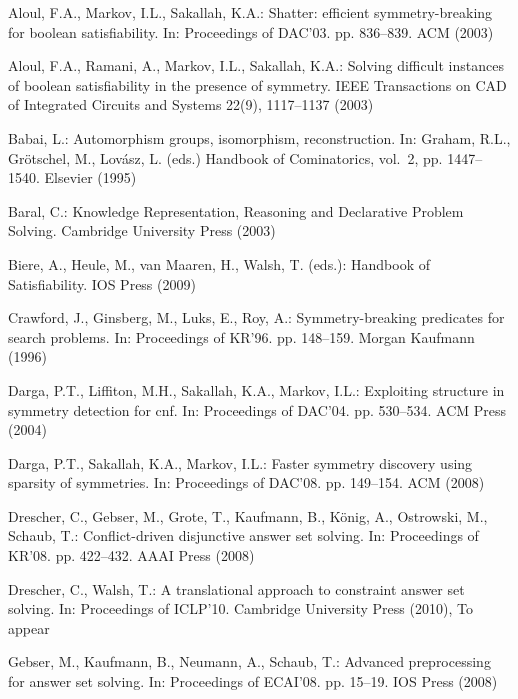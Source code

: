 \documentclass[envcountsame]{llncs}
\begin{document}
\begin{thebibliography}{10}
\providecommand{\url}[1]{\texttt{#1}}
\providecommand{\urlprefix}{URL }

Aloul, F.A., Markov, I.L., Sakallah, K.A.: Shatter: efficient symmetry-breaking
  for boolean satisfiability. In: Proceedings of DAC'03. pp. 836--839. ACM
  (2003)

Aloul, F.A., Ramani, A., Markov, I.L., Sakallah, K.A.: Solving difficult
  instances of boolean satisfiability in the presence of symmetry. IEEE
  Transactions on CAD of Integrated Circuits and Systems  22(9),  1117--1137
  (2003)

Babai, L.: Automorphism groups, isomorphism, reconstruction. In: Graham, R.L.,
  Gr{\"o}tschel, M., Lov{\'a}sz, L. (eds.) Handbook of Cominatorics, vol.~2,
  pp. 1447--1540. Elsevier (1995)

Baral, C.: Knowledge Representation, Reasoning and Declarative Problem Solving.
  Cambridge University Press (2003)

Biere, A., Heule, M., {van Maaren}, H., Walsh, T. (eds.): Handbook of
  Satisfiability. IOS Press (2009)

Crawford, J., Ginsberg, M., Luks, E., Roy, A.: Symmetry-breaking predicates for
  search problems. In: Proceedings of KR'96. pp. 148--159. Morgan Kaufmann
  (1996)

Darga, P.T., Liffiton, M.H., Sakallah, K.A., Markov, I.L.: Exploiting structure
  in symmetry detection for cnf. In: Proceedings of DAC'04. pp. 530--534. ACM
  Press (2004)

Darga, P.T., Sakallah, K.A., Markov, I.L.: Faster symmetry discovery using
  sparsity of symmetries. In: Proceedings of DAC'08. pp. 149--154. ACM (2008)

Drescher, C., Gebser, M., Grote, T., Kaufmann, B., K{\"o}nig, A., Ostrowski,
  M., Schaub, T.: Conflict-driven disjunctive answer set solving. In:
  Proceedings of KR'08. pp. 422--432. AAAI Press (2008)

Drescher, C., Walsh, T.: A translational approach to constraint answer set
  solving. In: Proceedings of ICLP'10. Cambridge University Press (2010), {T}o
  appear

Gebser, M., Kaufmann, B., Neumann, A., Schaub, T.: Advanced preprocessing for
  answer set solving. In: Proceedings of ECAI'08. pp. 15--19. IOS Press (2008)


\end{thebibliography}
\end{document}
